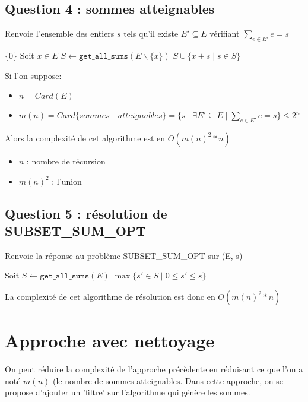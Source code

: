 \documentclass[10pt]{article}
\let\oldReturn\Return
\renewcommand{\Return}{\State\oldReturn}
\begin{document}
		\subsection{Question 4 : sommes atteignables}\label{get_all_sums}
			\begin{algorithm}
				\caption{Renvoie l'ensemble des entiers $s$ tels qu'il existe $E' \subseteq E$ vérifiant $\sum\limits_{e \in E'}e = s$}
				\begin{algorithmic}[1]
							\Return $\{0\}$
						\EndIf
						\State Soit $x \in E$
						\State $S \leftarrow \mathtt{get\_all\_sums}(E \backslash \{x\})$
						\Return $S \cup \{x + s \mid s \in S\}$
					\EndFunction
				\end{algorithmic}
			\end{algorithm}
			Si l'on suppose:
			\begin{itemize}[label=-]
				\setlength\itemsep{0.1em}
				\item $n = Card(E)$
				\item $m(n) = Card\{sommes \quad atteignables\} = \{s \mid \exists E' \subseteq E \mid \sum\limits_{e \in E'}e = s\} \leq 2^n$
			\end{itemize}
			Alors la complexité de cet algorithme est en $\boxed{O(m(n)^2 * n)}$
			\begin{itemize}[label=-]
				\setlength\itemsep{0.1em}
				\item $n$ : nombre de récursion
				\item $m(n)^2$ : l'union
			\end{itemize}

		\subsection{Question 5 : résolution de SUBSET\_SUM\_OPT}
			\begin{algorithm}
				\caption{Renvoie la réponse au problème SUBSET\_SUM\_OPT sur (E, s)}
				\begin{algorithmic}[1]
					\Function{subset\_sum}{$E \subset \mathbb{N}, s \in \mathbb{N}$}
						\State Soit $S \leftarrow \mathtt{get\_all\_sums}(E)$
						\Return $\max\{s' \in S \mid 0 \leq s' \leq s\}$
					\EndFunction
				\end{algorithmic}
			\end{algorithm}
			La complexité de cet algorithme de résolution est donc en $\boxed{O(m(n)^2 * n)}$

	\newpage
	\section{Approche avec nettoyage}\label{approche_naive}
		On peut réduire la complexité de l'approche précèdente en réduisant ce que l'on a noté $m(n)$ (le nombre de sommes atteignables.
		Dans cette approche, on se propose d'ajouter un 'filtre' sur l'algorithme qui génère les sommes.
\end{document}
